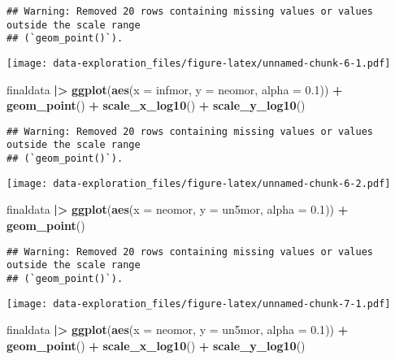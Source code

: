 \documentclass[
]{article}
\newenvironment{Shaded}{\begin{snugshade}}{\end{snugshade}}
\newcommand{\AttributeTok}[1]{\textcolor[rgb]{0.13,0.29,0.53}{#1}}
\newcommand{\FloatTok}[1]{\textcolor[rgb]{0.00,0.00,0.81}{#1}}
\newcommand{\FunctionTok}[1]{\textcolor[rgb]{0.13,0.29,0.53}{\textbf{#1}}}
\newcommand{\NormalTok}[1]{#1}
\newcommand{\SpecialCharTok}[1]{\textcolor[rgb]{0.81,0.36,0.00}{\textbf{#1}}}
\begin{document}
\begin{verbatim}
## Warning: Removed 20 rows containing missing values or values outside the scale range
## (`geom_point()`).
\end{verbatim}

\texttt{[image: data-exploration\_files/figure-latex/unnamed-chunk-6-1.pdf]}

\begin{Shaded}
\begin{Highlighting}[]
\NormalTok{finaldata }\SpecialCharTok{|\textgreater{}}
  \FunctionTok{ggplot}\NormalTok{(}\FunctionTok{aes}\NormalTok{(}\AttributeTok{x =}\NormalTok{ infmor, }\AttributeTok{y =}\NormalTok{ neomor, }\AttributeTok{alpha =} \FloatTok{0.1}\NormalTok{)) }\SpecialCharTok{+}
  \FunctionTok{geom\_point}\NormalTok{() }\SpecialCharTok{+}
  \FunctionTok{scale\_x\_log10}\NormalTok{() }\SpecialCharTok{+}
  \FunctionTok{scale\_y\_log10}\NormalTok{()}
\end{Highlighting}
\end{Shaded}

\begin{verbatim}
## Warning: Removed 20 rows containing missing values or values outside the scale range
## (`geom_point()`).
\end{verbatim}

\texttt{[image: data-exploration\_files/figure-latex/unnamed-chunk-6-2.pdf]}

\begin{Shaded}
\begin{Highlighting}[]
\NormalTok{finaldata }\SpecialCharTok{|\textgreater{}}
  \FunctionTok{ggplot}\NormalTok{(}\FunctionTok{aes}\NormalTok{(}\AttributeTok{x =}\NormalTok{ neomor, }\AttributeTok{y =}\NormalTok{ un5mor, }\AttributeTok{alpha =} \FloatTok{0.1}\NormalTok{)) }\SpecialCharTok{+}
  \FunctionTok{geom\_point}\NormalTok{()}
\end{Highlighting}
\end{Shaded}

\begin{verbatim}
## Warning: Removed 20 rows containing missing values or values outside the scale range
## (`geom_point()`).
\end{verbatim}

\texttt{[image: data-exploration\_files/figure-latex/unnamed-chunk-7-1.pdf]}

\begin{Shaded}
\begin{Highlighting}[]
\NormalTok{finaldata }\SpecialCharTok{|\textgreater{}}
  \FunctionTok{ggplot}\NormalTok{(}\FunctionTok{aes}\NormalTok{(}\AttributeTok{x =}\NormalTok{ neomor, }\AttributeTok{y =}\NormalTok{ un5mor, }\AttributeTok{alpha =} \FloatTok{0.1}\NormalTok{)) }\SpecialCharTok{+}
  \FunctionTok{geom\_point}\NormalTok{() }\SpecialCharTok{+}
  \FunctionTok{scale\_x\_log10}\NormalTok{() }\SpecialCharTok{+}
  \FunctionTok{scale\_y\_log10}\NormalTok{()}
\end{Highlighting}
\end{Shaded}
\end{document}
